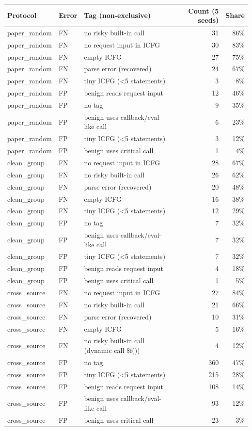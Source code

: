 \begin{tabular}{@{}lllrr@{}}
\toprule
Protocol & Error & Tag (non-exclusive) & Count (5 seeds) & Share \\ \midrule
paper\_random & FN & no risky built-in call & 31 & 86\% \\
paper\_random & FN & no request input in ICFG & 30 & 83\% \\
paper\_random & FN & empty ICFG & 27 & 75\% \\
paper\_random & FN & parse error (recovered) & 24 & 67\% \\
paper\_random & FN & tiny ICFG (<5 statements) & 3 & 8\% \\
paper\_random & FP & benign reads request input & 12 & 46\% \\
paper\_random & FP & no tag & 9 & 35\% \\
paper\_random & FP & benign uses callback/eval-like call & 6 & 23\% \\
paper\_random & FP & tiny ICFG (<5 statements) & 3 & 12\% \\
paper\_random & FP & benign uses critical call & 1 & 4\% \\
clean\_group & FN & no request input in ICFG & 28 & 67\% \\
clean\_group & FN & no risky built-in call & 26 & 62\% \\
clean\_group & FN & parse error (recovered) & 20 & 48\% \\
clean\_group & FN & empty ICFG & 16 & 38\% \\
clean\_group & FN & tiny ICFG (<5 statements) & 12 & 29\% \\
clean\_group & FP & no tag & 7 & 32\% \\
clean\_group & FP & benign uses callback/eval-like call & 7 & 32\% \\
clean\_group & FP & tiny ICFG (<5 statements) & 7 & 32\% \\
clean\_group & FP & benign reads request input & 4 & 18\% \\
clean\_group & FP & benign uses critical call & 1 & 5\% \\
cross\_source & FN & no request input in ICFG & 27 & 84\% \\
cross\_source & FN & no risky built-in call & 21 & 66\% \\
cross\_source & FN & parse error (recovered) & 10 & 31\% \\
cross\_source & FN & empty ICFG & 5 & 16\% \\
cross\_source & FN & no risky built-in call (dynamic call \$f()) & 4 & 12\% \\
cross\_source & FP & no tag & 360 & 47\% \\
cross\_source & FP & tiny ICFG (<5 statements) & 215 & 28\% \\
cross\_source & FP & benign reads request input & 108 & 14\% \\
cross\_source & FP & benign uses callback/eval-like call & 93 & 12\% \\
cross\_source & FP & benign uses critical call & 23 & 3\% \\
\bottomrule
\end{tabular}
